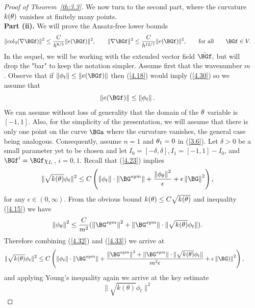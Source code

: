 \begin{proof}[Proof of Theorem~{\ref{th:3.3}}]
We now turn to the second part, where the curvature $k(\theta)$ vanishes at finitely many points.\\
\textbf{Part (ii). } We will prove the Ansatz-free lower bounds
\begin{equation}
\label{4.30}
\|\mathrm{col}_3(\nabla\BGf)\|^2\leq\frac{C}{h^{8/5}}\|e(\BGf)\|^2,\qquad\|\nabla\BGf\|^2\leq\frac{C}{h^{12/7}}\|e(\BGf)\|^2,\qquad\text{for all}\qquad \BGf\in V.
\end{equation}
In the sequel, we will be working with the extended vector field $\bar\BGf,$ but will drop the "bar" to keep the notation simpler. Assume first that the wavenumber $m$. Observe that if $\norm{\phi_t}\leq \norm{e(\BGf)}$ then (\ref{4.18}) would imply (\ref{4.30}) so we assume  that 
 \begin{equation}
 \label{4.31}
 \norm{e(\BGf)}\leq\norm{\phi_t}.
\end{equation}
We can assume without loss of generality that the domain of the $\theta$ variable is $[-1,1].$ Also, for the simplicity of the presentation, we will assume that there is only one point on the curve $\BGa$ where the curvature vanishes, the general case being analogous. Consequently, assume $n=1$ and $\theta_1=0$ in (\ref{3.6}). 
Let $\delta>0$ be a small parameter yet to be chosen and let $I_0= [-\delta,\delta], I_1=[-1,1]-I_0$, and $\BGf^i=\BGf\chi_{I_i}$, $i=0,1.$ 
Recall that (\ref{4.23}) implies 
\begin{equation}
\label{4.32}
\|\sqrt{k(\theta)}\phi_t\|^2\leq C\left( \norm{\phi_t}\cdot \norm{\BG^{sym}}+ \frac{\norm{\phi_\theta}^2}{\epsilon}+\epsilon\norm{\BG}^2\right),
\end{equation}
for any $\epsilon\in (0,\infty)$. From the obvious bound $k(\theta)\leq C\sqrt{k(\theta)}$ and inequality (\ref{4.15}) we have 
\begin{equation}
\label{4.33}
\norm{\phi_\theta}^2\leq \frac{C}{m^2}(\norm{\BG^{sym}}^2+\norm{\BG^{sym}}\cdot \|{\sqrt{k(\theta)}}\phi_t\|).
\end{equation}
Therefore combining (\ref{4.32}) and (\ref{4.33}) we arrive at
\begin{align*}
\|\sqrt{k(\theta)}\phi_t\|^2
&\leq C\left(\norm{\phi_t}\cdot \norm{\BG^{sym}}+\frac{\norm{\BG^{sym}}^2+\norm{\BG^{sym}}\cdot \|{\sqrt{k(\theta)}}\phi_t\|}{m^2\epsilon}
+\epsilon\norm{\BG)}^2\right),
\end{align*}
and applying Young's inequality again we arrive at the key estimate
\begin{equation}
\label{4.34}
\|\sqrt{k(\theta)}\phi_t\|^2

\end{equation}
\end{proof}
